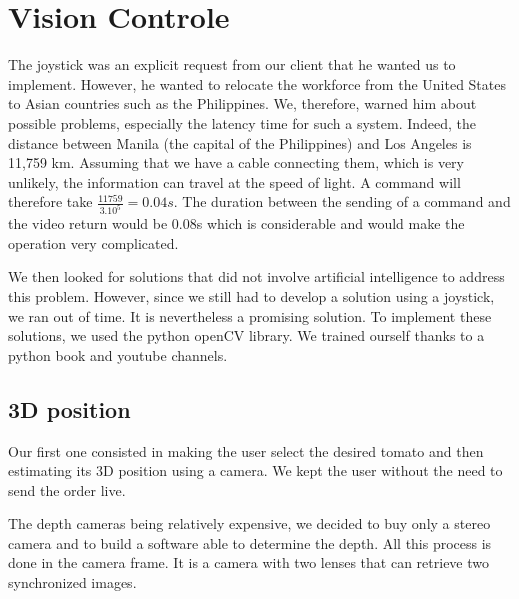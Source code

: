 \section{Vision Controle}\insertloftspace
\setcounter{figure}{0}\setcounter{table}{0}

The joystick was an explicit request from our client that he wanted us to implement. However, he wanted to relocate the workforce from the United States to Asian countries such as the Philippines. We, therefore, warned him about possible problems, especially the latency time for such a system. Indeed, the distance between Manila (the capital of the Philippines) and Los Angeles is 11,759 km. Assuming that we have a cable connecting them, which is very unlikely, the information can travel at the speed of light. A command will therefore take $\displaystyle{\frac{11759}{3.10^5}=0.04s}$. The duration between the sending of a command and the video return would be 0.08s which is considerable and would make the operation very complicated.

\bigbreak
We then looked for solutions that did not involve artificial intelligence to address this problem. However, since we still had to develop a solution using a joystick, we ran out of time. It is nevertheless a promising solution. To implement these solutions, we used the python openCV library\cite{opencvPython}. We trained ourself thanks to a python book and youtube channels.

\subsection{3D position}

Our first one consisted in making the user select the desired tomato and then estimating its 3D position using a camera. We kept the user without the need to send the order live. 

\bigbreak
The depth cameras being relatively expensive, we decided to buy only a stereo camera and to build a software able to determine the depth. All this process is done in the camera frame. It is a camera with two lenses that can retrieve two synchronized images.

